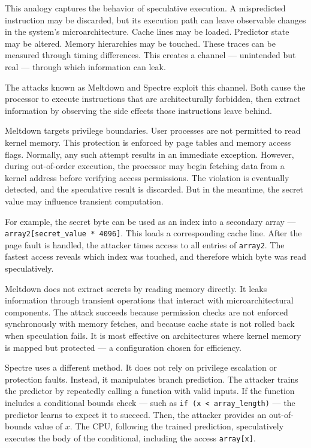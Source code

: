 This analogy captures the behavior of speculative execution. A mispredicted instruction may be discarded, but its execution path can leave observable changes in the system’s microarchitecture. Cache lines may be loaded. Predictor state may be altered. Memory hierarchies may be touched. These traces can be measured through timing differences. This creates a channel — unintended but real — through which information can leak.

The attacks known as Meltdown and Spectre exploit this channel. Both cause the processor to execute instructions that are architecturally forbidden, then extract information by observing the side effects those instructions leave behind.

Meltdown targets privilege boundaries. User processes are not permitted to read kernel memory. This protection is enforced by page tables and memory access flags. Normally, any such attempt results in an immediate exception. However, during out-of-order execution, the processor may begin fetching data from a kernel address before verifying access permissions. The violation is eventually detected, and the speculative result is discarded. But in the meantime, the secret value may influence transient computation.

For example, the secret byte can be used as an index into a secondary array — \texttt{array2[secret\_value * 4096]}. This loads a corresponding cache line. After the page fault is handled, the attacker times access to all entries of \texttt{array2}. The fastest access reveals which index was touched, and therefore which byte was read speculatively.

Meltdown does not extract secrets by reading memory directly. It leaks information through transient operations that interact with microarchitectural components. The attack succeeds because permission checks are not enforced synchronously with memory fetches, and because cache state is not rolled back when speculation fails. It is most effective on architectures where kernel memory is mapped but protected — a configuration chosen for efficiency.

Spectre uses a different method. It does not rely on privilege escalation or protection faults. Instead, it manipulates branch prediction. The attacker trains the predictor by repeatedly calling a function with valid inputs. If the function includes a conditional bounds check — such as \texttt{if (x < array\_length)} — the predictor learns to expect it to succeed. Then, the attacker provides an out-of-bounds value of $x$. The CPU, following the trained prediction, speculatively executes the body of the conditional, including the access \texttt{array[x]}.

